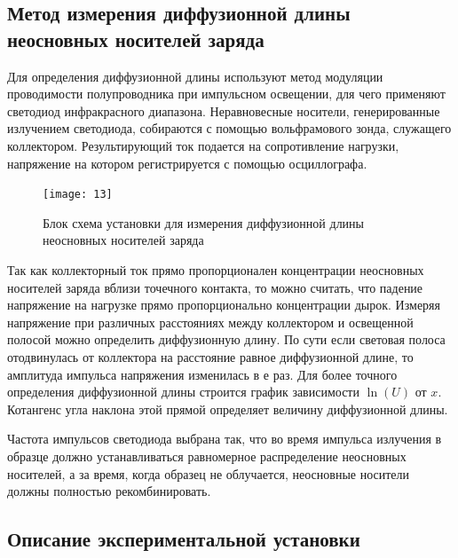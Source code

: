 \documentclass[a4paper,14pt]{extarticle}
\begin{document}
\subsection{Метод измерения диффузионной длины неосновных носителей заряда}

Для определения диффузионной длины используют метод модуляции проводимости полупроводника при импульсном освещении, для чего применяют светодиод инфракрасного диапазона. Неравновесные носители, генерированные излучением светодиода, собираются с помощью вольфрамового зонда, служащего коллектором. Результирующий ток подается на сопротивление нагрузки, напряжение на котором регистрируется с помощью осциллографа.

\begin{figure}[H]
	\centering
	\texttt{[image: 13]}
	\caption{Блок схема установки для измерения диффузионной длины неосновных носителей заряда}
	\label{fig:figure12}
\end{figure}


Так как коллекторный ток прямо пропорционален концентрации неосновных носителей заряда вблизи точечного контакта, то можно считать, что падение напряжение на нагрузке прямо пропорционально концентрации дырок. Измеряя напряжение при различных расстояниях между коллектором и освещенной полосой можно определить диффузионную длину. По сути если световая полоса отодвинулась от коллектора на расстояние равное диффузионной длине, то амплитуда импульса напряжения изменилась в $е$ раз. Для более точного определения диффузионной длины строится график зависимости $\ln(U)$ от $x$. Котангенс угла наклона этой прямой определяет величину диффузионной длины.

Частота импульсов светодиода выбрана так, что во время импульса излучения в образце должно устанавливаться равномерное распределение неосновных носителей, а за время, когда образец не облучается, неосновные носители должны полностью рекомбинировать.

\subsection{Описание экспериментальной установки}
\end{document}
